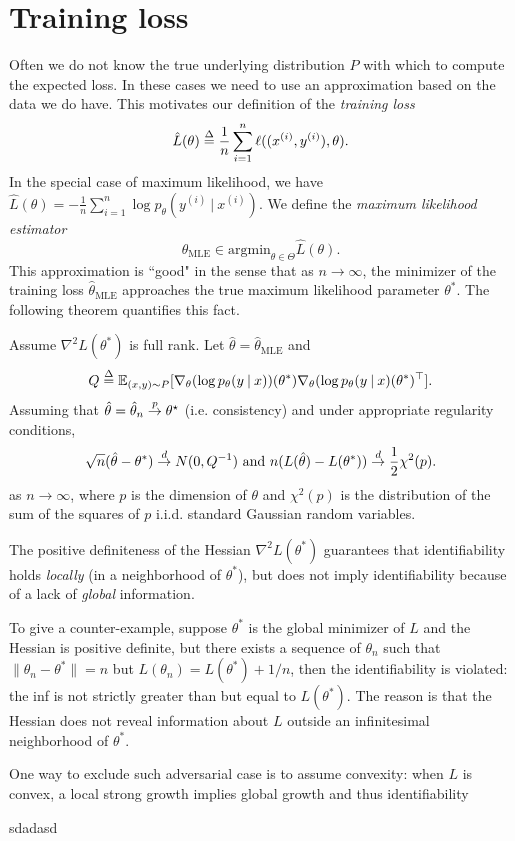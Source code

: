 \documentclass[]{subook}
\begin{document}
\section{Training loss}
Often we do not know the true underlying distribution $P$ with which to compute the expected loss. In these cases we need to use an approximation based on the data we do have. This motivates our definition of the \textit{training loss} $$\hat{L}(\theta) \defn \frac1n \sum_{i=1}^n \ell((x^{(i)},y^{(i)}),\theta).$$ In the special case of maximum likelihood, we have $\hat{L}(\theta) = -\frac1n \sum_{i=1}^n \log p_\theta(y^{(i)}\: | \:x^{(i)})$. We define the \textit{maximum likelihood estimator} $$\hat{\theta}_{\mathrm{MLE}} \in \mathrm{argmin}_{\theta\in\Theta} \hat{L}(\theta).$$ This approximation is ``good" in the sense that as $n\rightarrow\infty$, the minimizer of the training loss $\hat{\theta}_\mathrm{MLE}$ approaches the true maximum likelihood parameter $\theta^*$. The following theorem quantifies this fact.
\begin{theorem} \label{mle}
  Assume $\nabla^2 L(\theta^*)$ is full rank. Let $\hat{\theta} = \hat{\theta}_{\mathrm{MLE}}$ and $$Q \defn \E_{(x,y)\sim P}[\nabla_\theta(\log p_\theta(y\: | \: x))(\theta^*) \nabla_\theta(\log p_\theta(y\: | \: x)(\theta^*)^\top].$$
  Assuming that $\hat{\theta}=\hat{\theta}_n\stackrel{\tiny p}{\rightarrow}\theta^\star$ (i.e. consistency) and under appropriate regularity conditions,  $$\sqrt{n}(\hat{\theta}-\theta^*)\stackrel{\tiny d}{\rightarrow} N(0, Q^{-1}) \textup{ and } n(L(\hat{\theta}) - L(\theta^*))\stackrel{\tiny d}{\rightarrow} \frac12 \chi^2(p).$$ as $n\rightarrow\infty$, where $p$ is the dimension of $\theta$ and $\chi^2(p)$ is the distribution of the sum of the squares of $p$ i.i.d. standard Gaussian random variables.
\end{theorem}

\begin{remark}
    The positive definiteness of the Hessian $\nabla^2 L(\theta^\ast)$ guarantees that identifiability holds \emph{locally} (in a neighborhood of $\theta^\ast$), but does not imply identifiability because of a lack of \emph{global} information. 

To give a counter-example, suppose $\theta^\ast$ is the global minimizer of $L$ and the Hessian is positive definite, but there exists a sequence of $\theta_n$ such that $\|\theta_n-\theta^\ast\|=n$ but $L(\theta_n)=L(\theta^\ast)+1/n$, then the identifiability is violated: the inf is not strictly greater than but equal to $L(\theta^\ast)$. The reason is that the Hessian does not reveal information about $L$ outside an infinitesimal neighborhood of $\theta^\ast$.

One way to exclude such adversarial case is to assume convexity: when $L$ is convex, a local strong growth implies global growth and thus identifiability
\end{remark}


\begin{example}[fasd]
    sdadasd
\end{example}
\end{document}
